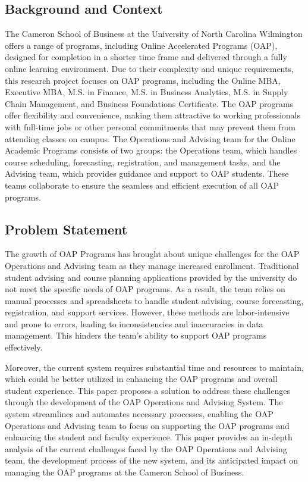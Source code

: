\documentclass[12pt]{article}
\begin{document}
\subsection{Background and Context}
The Cameron School of Business at the University of North Carolina Wilmington offers a range of programs, including Online Accelerated Programs (OAP), designed for completion in a shorter time frame and delivered through a fully online learning environment. Due to their complexity and unique requirements, this research project focuses on OAP programs, including the Online MBA, Executive MBA, M.S. in Finance, M.S. in Business Analytics, M.S. in Supply Chain Management, and Business Foundations Certificate. The OAP programs offer flexibility and convenience, making them attractive to working professionals with full-time jobs or other personal commitments that may prevent them from attending classes on campus. The Operations and Advising team for the Online Academic Programs consists of two groups: the Operations team, which handles course scheduling, forecasting, registration, and management tasks, and the Advising team, which provides guidance and support to OAP students. These teams collaborate to ensure the seamless and efficient execution of all OAP programs.

\subsection{Problem Statement}
The growth of OAP Programs has brought about unique challenges for the OAP Operations and Advising team as they manage increased enrollment. Traditional student advising and course planning applications provided by the university do not meet the specific needs of OAP programs. As a result, the team relies on manual processes and spreadsheets to handle student advising, course forecasting, registration, and support services. However, these methods are labor-intensive and prone to errors, leading to inconsistencies and inaccuracies in data management. This hinders the team's ability to support OAP programs effectively.

Moreover, the current system requires substantial time and resources to maintain, which could be better utilized in enhancing the OAP programs and overall student experience. This paper proposes a solution to address these challenges through the development of the OAP Operations and Advising System. The system streamlines and automates necessary processes, enabling the OAP Operations and Advising team to focus on supporting the OAP programs and enhancing the student and faculty experience. This paper provides an in-depth analysis of the current challenges faced by the OAP Operations and Advising team, the development process of the new system, and its anticipated impact on managing the OAP programs at the Cameron School of Business.
\end{document}
